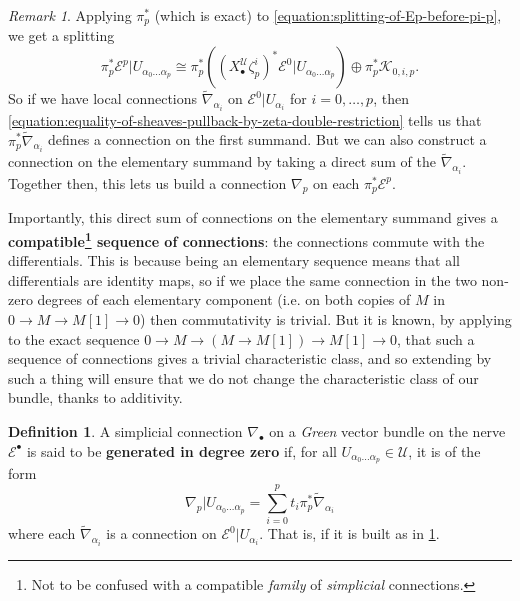 \documentclass[11pt,fleqn]{article}
\theoremstyle{plain}
\theoremstyle{definition}
\newtheorem{definition}[theorem]{Definition}
\theoremstyle{remark}
\newtheorem{remark}[theorem]{Remark}
\numberwithin{equation}{theorem}
\newcommand{\cover}{\mathcal{U}}
\newcommand{\restricted}{\mathbin{\big\vert}}
\newcommand{\define}[1]{\textbf{#1}}
\newcommand{\nerve}[1]{X_{#1}^\cover}
\begin{document}
        \begin{remark}\label{remark:explaining-compatible-extension-of-connection}
            Applying $\pi_p^*$ (which is exact) to \cref{equation:splitting-of-Ep-before-pi-p}, we get a splitting
            \begin{equation}
            \label{equation:that-splitting-of-Ep}
                \pi_p^* \mathcal{E}^p \restricted U_{\alpha_0\ldots\alpha_p}
                \cong
                \pi_p^* \left( \left(\nerve{\bullet}\zeta_p^i\right)^* \mathcal{E}^0 \restricted U_{\alpha_0\ldots\alpha_p}\right)
                \oplus
                \pi_p^* \mathcal{K}_{0,i,p}.
            \end{equation}
            So if we have local connections $\widetilde{\nabla}_{\alpha_i}$ on $\mathcal{E}^0\restricted U_{\alpha_i}$ for $i=0,\ldots,p$, then \cref{equation:equality-of-sheaves-pullback-by-zeta-double-restriction} tells us that $\pi_p^*\widetilde{\nabla}_{\alpha_i}$ defines a connection on the first summand.
            But we can also construct a connection on  the elementary summand by taking a direct sum of the $\widetilde{\nabla}_{\alpha_i}$.
            Together then, this lets us build a connection $\nabla_p$ on each $\pi_p^*\mathcal{E}^p$.

            Importantly, this direct sum of connections on the elementary summand gives a \define{compatible\footnote{Not to be confused with a compatible \emph{family} of \emph{simplicial} connections.} sequence of connections}: the connections commute with the differentials.
            This is because being an elementary sequence means that all differentials are identity maps, so if we place the same connection in the two non-zero degrees of each elementary component (i.e. on both copies of $M$ in $0\to M\to M[1]\to 0$) then commutativity is trivial.
            But it is known, by applying \cite[Lemma~4.22]{Baum&Bott1972} to the exact sequence $0\to M \to (M\to M[1])\to M[1]\to0$, that such a sequence of connections gives a trivial characteristic class, and so extending by such a thing will ensure that we do not change the characteristic class of our bundle, thanks to additivity.
        \end{remark}

        \begin{definition}\label{definition:generated-in-degree-zero}
            A simplicial connection $\nabla_\bullet$ on a \emph{Gre{}en} vector bundle on the nerve $\mathcal{E}^\bullet$ is said to be \define{generated in degree zero} if, for all $U_{\alpha_0\ldots\alpha_p}\in\cover$, it is of the form
            \[
                \nabla_p\restricted U_{\alpha_0\ldots\alpha_p}
                = \sum_{i=0}^p t_i \pi_p^*\widetilde{\nabla}_{\alpha_i}
            \]
            where each $\widetilde{\nabla}_{\alpha_i}$ is a connection on $\mathcal{E}^0\restricted U_{\alpha_i}$.
            That is, if it is built as in \cref{remark:explaining-compatible-extension-of-connection}.
        \end{definition}
\end{document}
